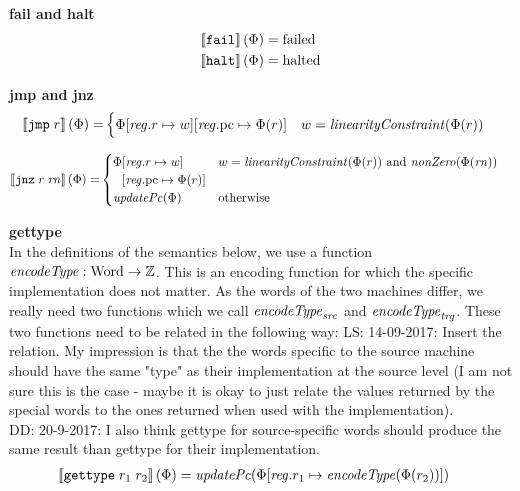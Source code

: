 \documentclass[a3paper]{article}
\newcommand\lau[1]{{\color{purple} \sf \footnotesize {LS: #1}}\\}
\newcommand\dominique[1]{{\color{purple} \sf \footnotesize {DD: #1}}\\}
\newcommand{\sem}[1]{\left\llbracket #1 \right\rrbracket}
\newcommand{\tand}{\text{ and }}
\newcommand{\totherwise}{\text{otherwise }}
\newcommand{\targetcolor}[1]{\color{black}}
\newcommand{\trg}[1]{{\targetcolor{} #1}}
\newcommand{\zinstr}[1]{\texttt{#1}}
\newcommand{\oneinstr}[2]{
  \ifthenelse{\equal{#2}{}}
  {\zinstr{#1}}
  {\zinstr{#1} \; #2}
}
\newcommand{\twoinstr}[3]{
  \ifthenelse{\equal{#2#3}{}}
  {\zinstr{#1}}
  {\zinstr{#1} \; #2 \; #3}
}
\newcommand{\tfail}{\zinstr{\trg{fail}}}
\newcommand{\thalt}{\zinstr{\trg{halt}}}
\newcommand{\tjmp}[1]{\oneinstr{\trg{jmp}}{#1}}
\newcommand{\tjnz}[2]{\twoinstr{\trg{jnz}}{#1}{#2}}
\newcommand{\tisptr}[2]{\twoinstr{\trg{gettype}}{#1}{#2}}
\newcommand{\ints}{\mathbb{Z}}
\newcommand{\update}[2]{[#1 \mapsto #2]}
\newcommand{\updReg}[2]{\update{\reg.#1}{#2}}
\newcommand{\shareddom}[1]{\mathrm{#1}}
\newcommand{\Word}{\shareddom{Word}}
\newcommand{\failed}{\mathrm{failed}}
\newcommand{\halted}{\mathrm{halted}}
\newcommand{\var}[1]{\mathit{#1}}
\newcommand{\rn}{\var{rn}}
\newcommand{\reg}{\var{reg}}
\newcommand{\pcreg}{\mathrm{pc}}
\newcommand{\plainfun}[2]{
  \ifthenelse{\equal{#2}{}}
  {\mathit{#1}}
  {\mathit{#1}(#2)}
}
\newcommand{\encType}[1]{\plainfun{encodeType}{#1}}
\newcommand{\linCons}[1]{\plainfun{linearityConstraint}{#1}}
\newcommand{\nonZero}[1]{\plainfun{nonZero}{#1}}
\newcommand{\updPcAddr}[1]{\plainfun{updatePc}{#1}}
\begin{document}
\noindent\textbf{fail and halt}\\
\begin{align*}
  \sem{\tfail}(\Phi) = & \; \failed \\
  \sem{\thalt}(\Phi) = & \; \halted
\end{align*}

\noindent\textbf{jmp and jnz}\\
\begin{align*}
  \sem{\tjmp{r}}(\Phi) = &  
                     \begin{cases}
                       \Phi\updReg{r}{w}\updReg{\pcreg}{\Phi(r)} & w = \linCons{\Phi(r)}
                     \end{cases}
\end{align*}

\begin{align*}
  \sem{\tjnz{r}{\rn}}(\Phi) = &       
                             \begin{cases}
                               \arraycolsep=0pt
                               \begin{array}[t]{rl}
                                 \Phi&\updReg{r}{w}\\
                                     &\updReg{\pcreg}{\Phi(r)}
                               \end{array} 
                                              & w = \linCons{\Phi(r)} \tand \nonZero{\Phi(\rn)}\\
                               \updPcAddr{\Phi} & \totherwise
                             \end{cases}
\end{align*}

\noindent\textbf{gettype}\\
In the definitions of the semantics below, we use a function $\encType{} : \Word \rightarrow \ints$. This is an encoding function for which the specific implementation does not matter. As the words of the two machines differ, we really need two functions which we call $\encType{}_{\var{src}}$ and $\encType{}_{\var{trg}}$. These two functions need to be related in the following way:
\lau{14-09-2017: Insert the relation. My impression is that the the words specific to the source machine should have the same "type" as their implementation at the source level (I am not sure this is the case - maybe it is okay to just relate the values returned by the special words to the ones returned when used with the implementation). }
\dominique{20-9-2017: I also think gettype for source-specific words should produce the same result than gettype for their implementation.}
\begin{align*}
  \sem{\tisptr{r_1}{r_2}}(\Phi) = & \; \updPcAddr{}(\Phi\updReg{r_1}{\encType{\Phi(r_2)}})
\end{align*}
\end{document}
